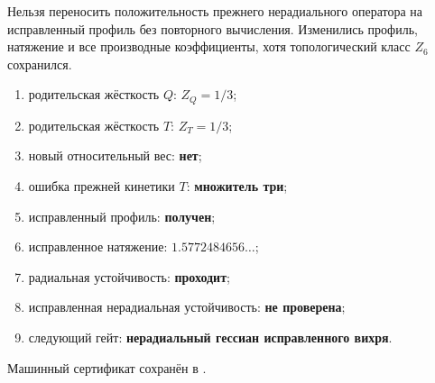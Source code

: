 \begin{nogocriterion}
Нельзя переносить положительность прежнего нерадиального оператора на
исправленный профиль без повторного вычисления. Изменились профиль,
натяжение и все производные коэффициенты, хотя топологический класс
$Z_6$ сохранился.
\end{nogocriterion}

\begin{protocol}
\begin{enumerate}
 \item родительская жёсткость $Q$: \textbf{$Z_Q=1/3$};
 \item родительская жёсткость $T$: \textbf{$Z_T=1/3$};
 \item новый относительный вес: \textbf{нет};
 \item ошибка прежней кинетики $T$: \textbf{множитель три};
 \item исправленный профиль: \textbf{получен};
 \item исправленное натяжение: \textbf{$1.5772484656\ldots$};
 \item радиальная устойчивость: \textbf{проходит};
 \item исправленная нерадиальная устойчивость: \textbf{не проверена};
 \item следующий гейт: \textbf{нерадиальный гессиан исправленного вихря}.
\end{enumerate}
\end{protocol}

Машинный сертификат сохранён в
.
